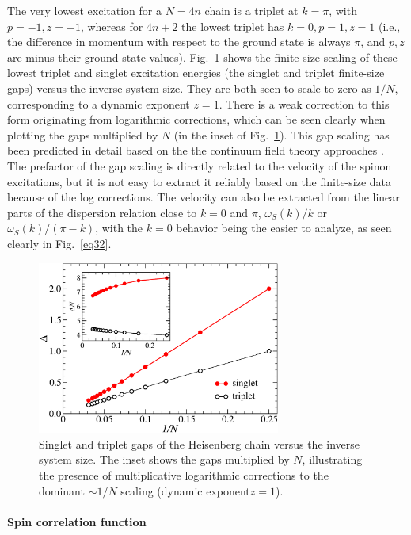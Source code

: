 \documentclass[draft,numberedheadings]{aipproc}
\begin{document}
The very lowest excitation for a $N=4n$ chain is a triplet at $k=\pi$, with $p=-1,z=-1$, whereas for $4n+2$ the lowest triplet has $k=0,p=1,z=1$ (i.e., the 
difference in momentum with respect to the ground state is always $\pi$, and $p,z$ are minus their ground-state values). Fig.~\ref{gaps} shows the finite-size 
scaling of these lowest triplet and singlet excitation energies (the singlet and triplet finite-size gaps) versus the inverse system size. They are
both seen to scale to zero as $1/N$, corresponding to a dynamic exponent $z=1$. There is a weak correction to this form originating from logarithmic corrections, 
which can be seen clearly when plotting the gaps multiplied by $N$ (in the inset of Fig.~\ref{gaps}). This gap scaling has been predicted in detail based on the 
the continuum field theory approaches \cite{affleck2,affleck3}. The prefactor of the gap scaling is directly related to the velocity of the spinon excitations,
but it is not easy to extract it reliably based on the finite-size data because of the log corrections. The velocity can also be extracted from the linear 
parts of the dispersion relation close to $k=0$ and $\pi$, $\omega_S(k)/k$  or $\omega_S(k)/(\pi-k)$, with the $k=0$ behavior being the easier to analyze, 
as seen clearly in Fig.~\ref{eq32}.

\begin{figure}
\includegraphics[width=8cm, clip]{gaps.eps}
\caption{Singlet and triplet gaps of the Heisenberg chain versus the inverse system size. The inset shows the gaps multiplied by $N$, 
illustrating the presence of multiplicative logarithmic corrections to the dominant $\sim 1/N$ scaling (dynamic exponent$z=1$).}
\label{gaps}
\end{figure}

\paragraph{Spin correlation function}
\end{document}
